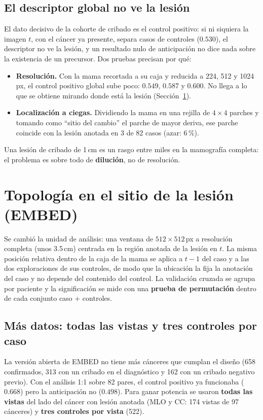 \subsection{El descriptor global no ve la lesión}
\label{subsec:ceguera-global}
El dato decisivo de la cohorte de cribado es el control positivo: si ni
siquiera la imagen $t$, con el cáncer ya presente, separa casos de
controles ($0.530$), el descriptor no ve la lesión, y un resultado nulo de
anticipación no dice nada sobre la existencia de un precursor. Dos pruebas
precisan por qué:
\begin{itemize}
  \item \textbf{Resolución.} Con la mama recortada a su caja y reducida a
        224, 512 y 1024\,px, el control positivo global sube poco: $0.549$,
        $0.587$ y $0.600$. No llega a lo que se obtiene mirando donde está
        la lesión (Sección~\ref{sec:resultados-sitio}).
  \item \textbf{Localización a ciegas.} Dividiendo la mama en una rejilla
        de $4\times4$ parches y tomando como ``sitio del cambio'' el parche
        de mayor deriva, ese parche coincide con la lesión anotada en 3 de
        82 casos (azar: 6\,\%).
\end{itemize}
Una lesión de cribado de 1\,cm es un rasgo entre miles en la mamografía
completa: el problema es sobre todo de \textbf{dilución}, no de resolución.

\section{Topología en el sitio de la lesión (EMBED)}
\label{sec:resultados-sitio}
Se cambió la unidad de análisis: una ventana de $512\times512$\,px a
resolución completa (unos 3.5\,cm) centrada en la región anotada de la
lesión en $t$. La misma posición relativa dentro de la caja de la mama se
aplica a $t-1$ del caso y a las dos exploraciones de sus controles, de modo
que la ubicación la fija la anotación del caso y no depende del contenido
del control. La validación cruzada se agrupa por paciente y la
significación se mide con una \textbf{prueba de permutación} dentro de cada
conjunto caso + controles.

\subsection{Más datos: todas las vistas y tres controles por caso}
La versión abierta de EMBED no tiene más cánceres que cumplan el diseño (658
confirmados, 313 con un cribado en el diagnóstico y 162 con un cribado
negativo previo). Con el análisis 1:1 sobre 82 pares, el control positivo ya
funcionaba ($0.668$) pero la anticipación no ($0.498$). Para ganar potencia
se usaron \textbf{todas las vistas} del lado del cáncer con lesión anotada
(MLO y CC: 174 vistas de 97 cánceres) y \textbf{tres controles por vista}
(522).

